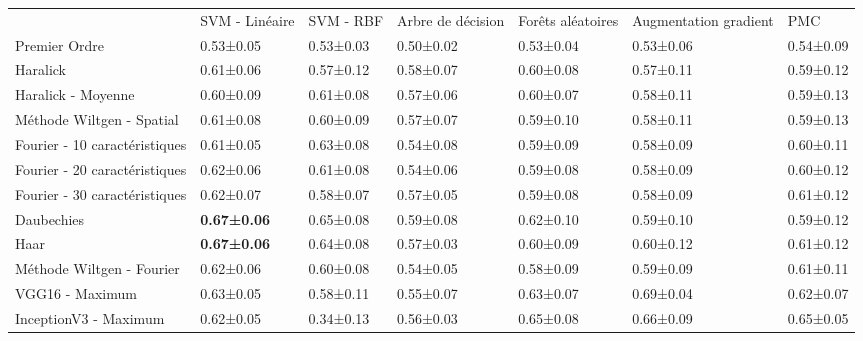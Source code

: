 \begin{landscape}
\begin{table}[]
\begin{tabular}{lllllll}
                              & SVM - Linéaire     & SVM - RBF          & Arbre de décision & Forêts aléatoires & Augmentation gradient & PMC       \\
Premier Ordre                 & 0.53±0.05          & 0.53±0.03          & 0.50±0.02         & 0.53±0.04         & 0.53±0.06             & 0.54±0.09 \\
\rowcolor[HTML]{E7E6E6} 
Haralick                      & 0.61±0.06          & 0.57±0.12          & 0.58±0.07         & 0.60±0.08         & 0.57±0.11             & 0.59±0.12 \\
Haralick - Moyenne            & 0.60±0.09          & 0.61±0.08          & 0.57±0.06         & 0.60±0.07         & 0.58±0.11             & 0.59±0.13 \\
Méthode Wiltgen - Spatial     & 0.61±0.08          & 0.60±0.09          & 0.57±0.07         & 0.59±0.10         & 0.58±0.11             & 0.59±0.13 \\
Fourier - 10 caractéristiques & 0.61±0.05          & 0.63±0.08          & 0.54±0.08         & 0.59±0.09         & 0.58±0.09             & 0.60±0.11 \\
Fourier - 20 caractéristiques & 0.62±0.06          & 0.61±0.08          & 0.54±0.06         & 0.59±0.08         & 0.58±0.09             & 0.60±0.12 \\
Fourier - 30 caractéristiques & 0.62±0.07          & 0.58±0.07          & 0.57±0.05         & 0.59±0.08         & 0.58±0.09             & 0.61±0.12 \\
\rowcolor[HTML]{E7E6E6} 
Daubechies                    & \textbf{0.67±0.06} & 0.65±0.08          & 0.59±0.08         & 0.62±0.10         & 0.59±0.10             & 0.59±0.12 \\
Haar                          & \textbf{0.67±0.06} & 0.64±0.08          & 0.57±0.03         & 0.60±0.09         & 0.60±0.12             & 0.61±0.12 \\
Méthode Wiltgen - Fourier     & 0.62±0.06          & 0.60±0.08          & 0.54±0.05         & 0.58±0.09         & 0.59±0.09             & 0.61±0.11 \\
VGG16    - Maximum            & 0.63±0.05          & 0.58±0.11          & 0.55±0.07         & 0.63±0.07         & 0.69±0.04             & 0.62±0.07 \\
InceptionV3  - Maximum        & 0.62±0.05          & 0.34±0.13          & 0.56±0.03         & 0.65±0.08         & 0.66±0.09             & 0.65±0.05 \\

\end{tabular}
\end{table}
\end{landscape}

